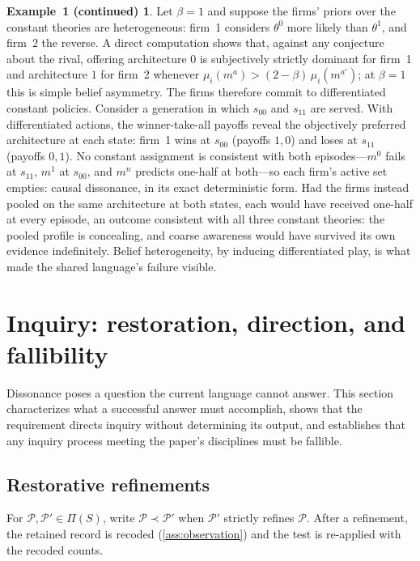 \documentclass[11pt]{article}
\theoremstyle{definition}
\newtheorem*{excont}{Example~1 (continued)}
\begin{document}
\begin{excont}
Let $\beta=1$ and suppose the firms' priors over the constant theories are
heterogeneous: firm~1 considers $\theta^0$ more likely than $\theta^1$, and
firm~2 the reverse.  A direct computation shows that, against any conjecture
about the rival, offering architecture $0$ is subjectively strictly dominant
for firm~1 and architecture $1$ for firm~2 whenever
$\mu_i(m^a)>(2-\beta)\,\mu_i(m^{a'})$; at $\beta=1$ this is simple belief
asymmetry.  The firms therefore commit to differentiated constant policies.
Consider a generation in which $s_{00}$ and $s_{11}$ are served.  With
differentiated actions, the winner-take-all payoffs reveal the objectively
preferred architecture at each state: firm~1 wins at $s_{00}$ (payoffs
$1,0$) and loses at $s_{11}$ (payoffs $0,1$).  No constant assignment is
consistent with both episodes---$m^0$ fails at $s_{11}$, $m^1$ at $s_{00}$,
and $m^n$ predicts one-half at both---so each firm's active set empties:
causal dissonance, in its exact deterministic form.  Had the firms instead
pooled on the same architecture at both states, each would have received
one-half at every episode, an outcome consistent with all three constant
theories: the pooled profile is concealing, and coarse awareness would have
survived its own evidence indefinitely.  Belief heterogeneity, by inducing
differentiated play, is what made the shared language's failure visible.
\end{excont}
\section{Inquiry: restoration, direction, and fallibility}
\label{sec:inquiry}

Dissonance poses a question the current language cannot answer.  This
section characterizes what a successful answer must accomplish, shows that
the requirement directs inquiry without determining its output, and
establishes that any inquiry process meeting the paper's disciplines must be
fallible.

\subsection{Restorative refinements}

For $\mathcal P,\mathcal P'\in\Pi(S)$, write $\mathcal P\prec\mathcal P'$
when $\mathcal P'$ strictly refines $\mathcal P$.  After a refinement, the
retained record is recoded (\cref{ass:observation}) and the test is
re-applied with the recoded counts.
\end{document}
